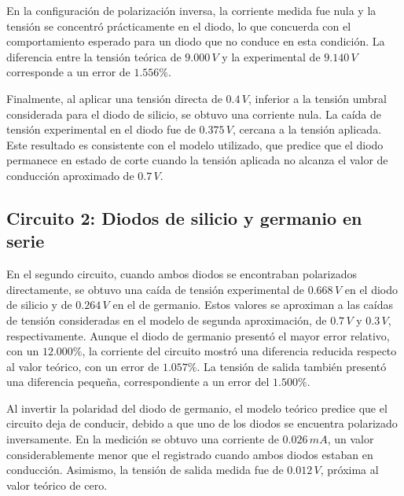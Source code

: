 \vspace{0.3cm}

En la configuración de polarización inversa, la corriente medida fue nula y la tensión se concentró prácticamente en el diodo, lo que concuerda con el comportamiento esperado para un diodo que no conduce en esta condición. La diferencia entre la tensión teórica de \(9.000\,V\) y la experimental de \(9.140\,V\) corresponde a un error de \(1.556\%\).

\vspace{0.3cm}

Finalmente, al aplicar una tensión directa de \(0.4\,V\), inferior a la tensión umbral considerada para el diodo de silicio, se obtuvo una corriente nula. La caída de tensión experimental en el diodo fue de \(0.375\,V\), cercana a la tensión aplicada. Este resultado es consistente con el modelo utilizado, que predice que el diodo permanece en estado de corte cuando la tensión aplicada no alcanza el valor de conducción aproximado de \(0.7\,V\).

\subsection{Circuito 2: Diodos de silicio y germanio en serie}

En el segundo circuito, cuando ambos diodos se encontraban polarizados directamente, se obtuvo una caída de tensión experimental de \(0.668\,V\) en el diodo de silicio y de \(0.264\,V\) en el de germanio. Estos valores se aproximan a las caídas de tensión consideradas en el modelo de segunda aproximación, de \(0.7\,V\) y \(0.3\,V\), respectivamente. Aunque el diodo de germanio presentó el mayor error relativo, con un \(12.000\%\), la corriente del circuito mostró una diferencia reducida respecto al valor teórico, con un error de \(1.057\%\). La tensión de salida también presentó una diferencia pequeña, correspondiente a un error del \(1.500\%\).

\vspace{0.3cm}

Al invertir la polaridad del diodo de germanio, el modelo teórico predice que el circuito deja de conducir, debido a que uno de los diodos se encuentra polarizado inversamente. En la medición se obtuvo una corriente de \(0.026\,mA\), un valor considerablemente menor que el registrado cuando ambos diodos estaban en conducción. Asimismo, la tensión de salida medida fue de \(0.012\,V\), próxima al valor teórico de cero.

\vspace{0.3cm}

